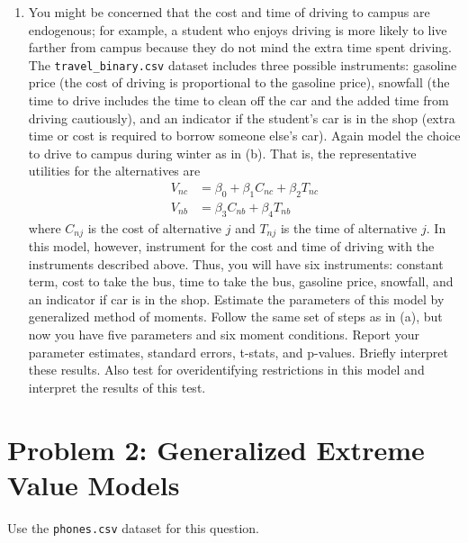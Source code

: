 \documentclass[11pt,letterpaper]{article}
\begin{document}
\begin{enumerate}[label=\alph*., leftmargin=*]
	\item You might be concerned that the cost and time of driving to campus are endogenous; for example, a student who enjoys driving is more likely to live farther from campus because they do not mind the extra time spent driving. The \texttt{travel\_binary.csv} dataset includes three possible instruments: gasoline price (the cost of driving is proportional to the gasoline price), snowfall (the time to drive includes the time to clean off the car and the added time from driving cautiously), and an indicator if the student's car is in the shop (extra time or cost is required to borrow someone else's car). Again model the choice to drive to campus during winter as in (b). That is, the representative utilities for the alternatives are
	\begin{align*}
		V_{nc} &= \beta_0 + \beta_1 C_{nc} + \beta_2 T_{nc} \\
		V_{nb} &= \beta_3 C_{nb} + \beta_4 T_{nb}
	\end{align*}
	where $C_{nj}$ is the cost of alternative $j$ and $T_{nj}$ is the time of alternative $j$. In this model, however, instrument for the cost and time of driving with the instruments described above. Thus, you will have six instruments: constant term, cost to take the bus, time to take the bus, gasoline price, snowfall, and an indicator if car is in the shop. Estimate the parameters of this model by generalized method of moments. Follow the same set of steps as in (a), but now you have five parameters and six moment conditions. Report your parameter estimates, standard errors, t-stats, and p-values. Briefly interpret these results. Also test for overidentifying restrictions in this model and interpret the results of this test.
\end{enumerate}

\section*{Problem 2: Generalized Extreme Value Models}

Use the \texttt{phones.csv} dataset for this question.
\end{document}

